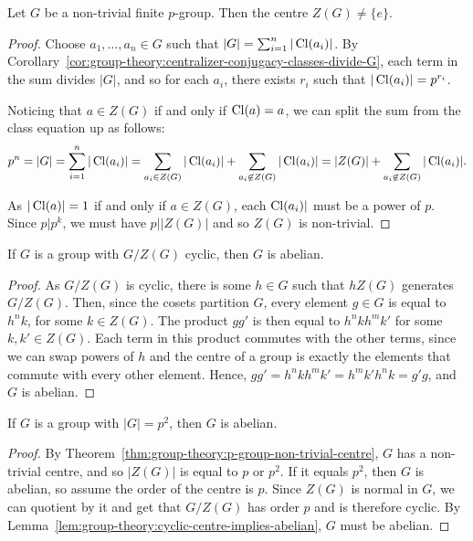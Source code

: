 \begin{theorem}\label{thm:group-theory:p-group-non-trivial-centre}
  Let \(G\) be a non-trivial finite \(p\)-group. Then the centre \(Z(G) \neq \{e\}\).
\end{theorem}

\begin{proof}
  Choose \(a_{1}, \ldots, a_{n} \in G\) such that \(|G| = \sum_{i=1}^{n} |\operatorname{Cl}(a_{i})|\). By Corollary~\ref{cor:group-theory:centralizer-conjugacy-classes-divide-G}, each term in the sum divides \(|G|\), and so for each \(a_{i}\), there exists \(r_{i}\) such that \(|\operatorname{Cl}(a_{i})| = p^{r_{i}}\).

  Noticing that \(a \in Z(G)\) if and only if \(\operatorname{Cl}(a) = {a}\), we can split the sum from the class equation up as follows:
  \[ p^{n} = |G| = \sum_{i=1}^{n} |\operatorname{Cl}(a_{i})| = \sum_{a_{i} \in Z(G)} |\operatorname{Cl}(a_{i})|+ \sum_{a_i \not\in Z(G)} |\operatorname{Cl}(a_{i})|= |Z(G)| + \sum_{a_i \not\in Z(G)}|\operatorname{Cl}(a_{i})|.\]

  As \(|\operatorname{Cl}(a)| = 1\) if and only if \(a \in Z(G)\), each \(\operatorname{Cl}(a_{i})|\) must be a power of \(p\). Since \(p | p^{k}\), we must have \(p | |Z(G)|\) and so \(Z(G)\) is non-trivial.
\end{proof}

\begin{lemma}\label{lem:group-theory:cyclic-centre-implies-abelian}
  If \(G\) is a group with \(G / Z(G)\) cyclic, then \(G\) is abelian.
\end{lemma}

\begin{proof}
  As \(G / Z(G)\) is cyclic, there is some \(h \in G\) such that \(hZ(G)\) generates \(G / Z(G)\). Then, since the cosets partition \(G\), every element \(g \in G\) is equal to \(h^{n}k\), for some \(k \in Z(G)\). The product \(gg'\) is then equal to \(h^{n}kh^{m}k'\) for some \(k, k' \in Z(G)\). Each term in this product commutes with the other terms, since we can swap powers of \(h\) and the centre of a group is exactly the elements that commute with every other element. Hence, \(gg' = h^{n}kh^{m}k' = h^{m}k'h^{n}k = g'g\), and \(G\) is abelian.
\end{proof}

\begin{corollary}
  If \(G\) is a group with \(|G| = p^{2}\), then \(G\) is abelian.
\end{corollary}

\begin{proof}
  By Theorem~\ref{thm:group-theory:p-group-non-trivial-centre}, \(G\) has a non-trivial centre, and so \(|Z(G)|\) is equal to \(p\) or \(p^{2}\). If it equals \(p^{2}\), then \(G\) is abelian, so assume the order of the centre is \(p\). Since \(Z(G)\) is normal in \(G\), we can quotient by it and get that \(G/Z(G)\) has order \(p\) and is therefore cyclic. By Lemma~\ref{lem:group-theory:cyclic-centre-implies-abelian}, \(G\) must be abelian.
\end{proof}

